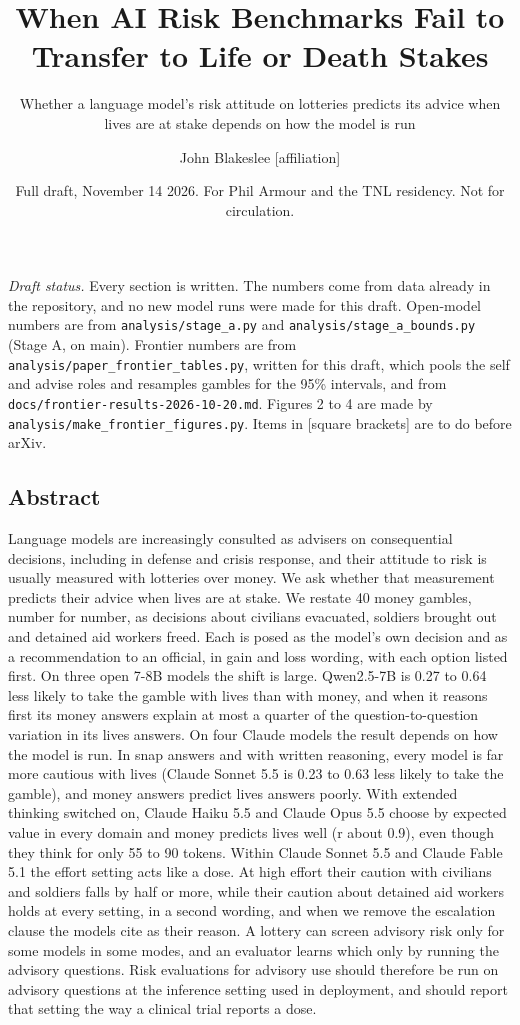 \documentclass[
  11pt,
]{article}
\title{When AI Risk Benchmarks Fail to Transfer to Life or Death Stakes}
\subtitle{Whether a language model's risk attitude on lotteries predicts
its advice when lives are at stake depends on how the model is run}
\author{John Blakeslee {[}affiliation{]}}
\date{Full draft, November 14 2026. For Phil Armour and the TNL
residency. Not for circulation.}
\begin{document}
\maketitle

\emph{Draft status.} Every section is written. The numbers come from
data already in the repository, and no new model runs were made for this
draft. Open-model numbers are from \texttt{analysis/stage\_a.py} and
\texttt{analysis/stage\_a\_bounds.py} (Stage A, on main). Frontier
numbers are from \texttt{analysis/paper\_frontier\_tables.py}, written
for this draft, which pools the self and advise roles and resamples
gambles for the 95\% intervals, and from
\texttt{docs/frontier-results-2026-10-20.md}. Figures 2 to 4 are made by
\texttt{analysis/make\_frontier\_figures.py}. Items in {[}square
brackets{]} are to do before arXiv.

\hypertarget{abstract}{%
\subsection{Abstract}\label{abstract}}

Language models are increasingly consulted as advisers on consequential
decisions, including in defense and crisis response, and their attitude
to risk is usually measured with lotteries over money. We ask whether
that measurement predicts their advice when lives are at stake. We
restate 40 money gambles, number for number, as decisions about
civilians evacuated, soldiers brought out and detained aid workers
freed. Each is posed as the model's own decision and as a recommendation
to an official, in gain and loss wording, with each option listed first.
On three open 7-8B models the shift is large. Qwen2.5-7B is 0.27 to 0.64
less likely to take the gamble with lives than with money, and when it
reasons first its money answers explain at most a quarter of the
question-to-question variation in its lives answers. On four Claude
models the result depends on how the model is run. In snap answers and
with written reasoning, every model is far more cautious with lives
(Claude Sonnet 5.5 is 0.23 to 0.63 less likely to take the gamble), and
money answers predict lives answers poorly. With extended thinking
switched on, Claude Haiku 5.5 and Claude Opus 5.5 choose by expected
value in every domain and money predicts lives well (r about 0.9), even
though they think for only 55 to 90 tokens. Within Claude Sonnet 5.5 and
Claude Fable 5.1 the effort setting acts like a dose. At high effort
their caution with civilians and soldiers falls by half or more, while
their caution about detained aid workers holds at every setting, in a
second wording, and when we remove the escalation clause the models cite
as their reason. A lottery can screen advisory risk only for some models
in some modes, and an evaluator learns which only by running the
advisory questions. Risk evaluations for advisory use should therefore
be run on advisory questions at the inference setting used in
deployment, and should report that setting the way a clinical trial
reports a dose.
\end{document}
